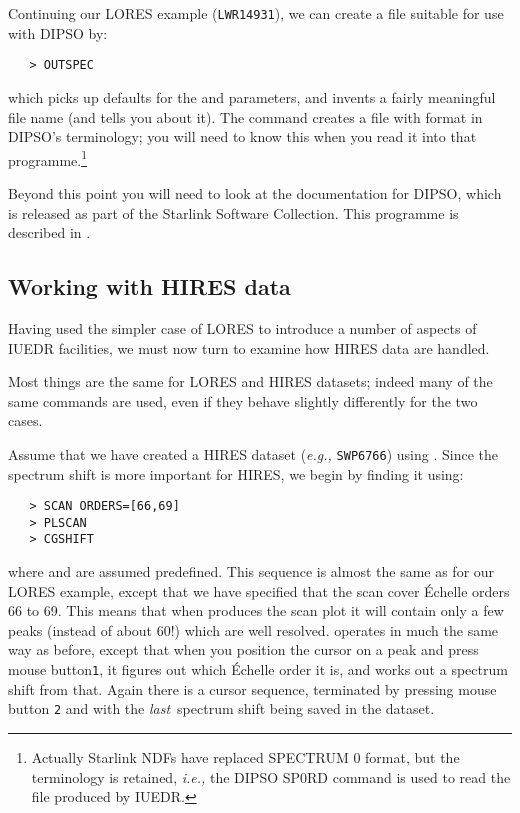 Continuing our LORES example (\verb+LWR14931+), we can create a file suitable
for use with DIPSO by:

\begin{verbatim}
   > OUTSPEC
\end{verbatim}

which picks up defaults for the 
 and 
 parameters,
and invents a fairly meaningful file name (and tells you about it)\@.  The
 command creates a file with format  in DIPSO's
terminology; you will need to know this when you read it into that
programme.\footnote{Actually Starlink NDFs have replaced SPECTRUM 0 format,
but the terminology is retained, {\it{i.e.,}} the DIPSO SP0RD command is used
to read the file produced by IUEDR\@.}

Beyond this point you will need to look at the documentation for DIPSO,
which is released as part of the Starlink Software Collection. This programme
is described in .


\subsection{Working with HIRES data}

Having used the simpler case of LORES to introduce a number of aspects of
IUEDR facilities, we must now turn to examine how HIRES data are handled.

Most things are the same for LORES and HIRES datasets; indeed many of the
same commands are used, even if they behave slightly differently for the two
cases.

Assume that we have created a HIRES dataset ({\it{e.g.,}} \verb+SWP6766+) using
\@.  Since the spectrum shift is more
important for HIRES, we begin by finding it using:

\begin{verbatim}
   > SCAN ORDERS=[66,69]
   > PLSCAN
   > CGSHIFT
\end{verbatim}

where 
 and 
 are assumed predefined.  This sequence
is almost the same as for our LORES example, except that we have specified that
the scan cover \'{E}chelle orders 66 to 69.  This means that when
produces the scan plot it will contain only a few peaks (instead of about 60!)
which are well resolved.  
 operates in much the same way as
before, except that when you position the cursor on a peak and press mouse
button\verb+1+, it figures out which \'{E}chelle order it is, and works out a
spectrum shift from that.  Again there is a cursor sequence, terminated by
pressing mouse button \verb+2+ and with the {\em last\,} spectrum shift being
saved in the dataset.

